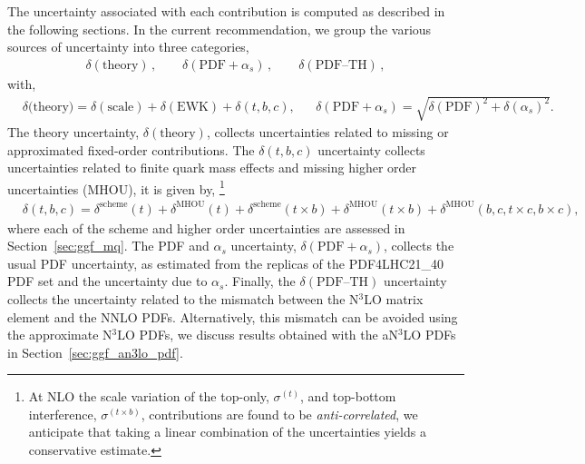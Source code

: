 The uncertainty associated with each contribution is computed as described in the following sections. 
In the current recommendation, we group the various sources of uncertainty into three categories, 
\begin{align}
\delta(\mathrm{theory})\,, \qquad 
\delta(\mathrm{PDF}+\alpha_s)\,, \qquad
\delta(\mathrm{PDF\text{--}TH})\,,
\end{align}
with,
\begin{align}
&\delta(\mathrm{theory)} = \delta(\mathrm{scale}) + \delta(\mathrm{EWK}) + \delta(t,b,c),&
&\delta(\mathrm{PDF}+\alpha_s) = \sqrt{\delta(\mathrm{PDF})^2 + \delta(\alpha_s)^2}.&
\end{align}
The theory uncertainty, $\delta(\mathrm{theory})$, collects uncertainties related to missing or approximated fixed-order contributions.
The $\delta(t,b,c)$ uncertainty collects uncertainties related to finite quark mass effects and missing higher order uncertainties (MHOU), it is given by,%
\footnote{
At NLO the scale variation of the top-only, $\sigma^{(t)}$, and top-bottom interference, $\sigma^{(t\times b)}$, contributions are found to be \emph{anti-correlated}, we anticipate that taking a linear combination of the uncertainties yields a conservative estimate.
}
\begin{align}
& \delta(t,b,c) = \delta^\mathrm{scheme}(t) + \delta^\mathrm{MHOU}(t) + \delta^{\mathrm{scheme}}(t \times b) + \delta^\mathrm{MHOU}(t \times b) + \delta^\mathrm{MHOU}(b, c, t \times c, b \times c),
\end{align}
where each of the scheme and higher order uncertainties are assessed in Section~\ref{sec:ggf_mq}.
The PDF and $\alpha_s$ uncertainty, $\delta(\mathrm{PDF}+\alpha_s)$, collects the usual PDF uncertainty, as estimated from the replicas of the PDF4LHC21\_40 PDF set and the uncertainty due to $\alpha_s$.
Finally, the $\delta(\mathrm{PDF\text{--}TH})$ uncertainty collects the uncertainty related to the mismatch between the N$^3$LO matrix element and the NNLO PDFs.
Alternatively, this mismatch can be avoided using the approximate N$^3$LO PDFs, we discuss results obtained with the aN$^3$LO PDFs in Section~\ref{sec:ggf_an3lo_pdf}.

